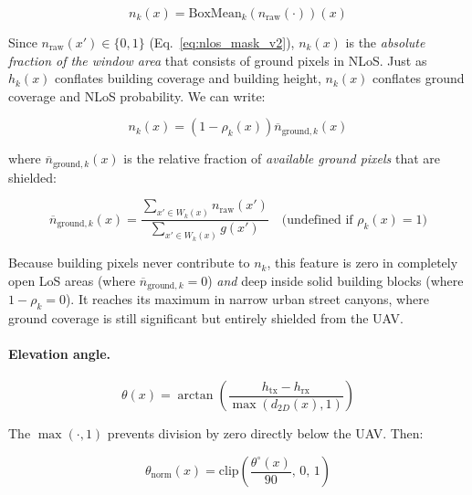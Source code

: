 \begin{equation}
n_k(x)=\mathrm{BoxMean}_k\!\left(n_{\mathrm{raw}}(\cdot)\right)(x)
\label{eq:n_k}
\end{equation}

Since $n_{\mathrm{raw}}(x') \in \{0,1\}$ (Eq.~\ref{eq:nlos_mask_v2}),
$n_k(x)$ is the \emph{absolute fraction of the window area} that consists of
ground pixels in NLoS. Just as $h_k(x)$ conflates building coverage and building
height, $n_k(x)$ conflates ground coverage and NLoS probability. We can write:

\begin{equation}
n_k(x)
=
\left(1 - \rho_k(x)\right)
\overline{n}_{\mathrm{ground}, k}(x)
\label{eq:n_k_interp}
\end{equation}

where $\overline{n}_{\mathrm{ground}, k}(x)$ is the relative fraction of
\emph{available ground pixels} that are shielded:

\begin{equation}
\overline{n}_{\mathrm{ground}, k}(x)
=
\frac{\displaystyle\sum_{x'\in W_k(x)} n_{\mathrm{raw}}(x')}
     {\displaystyle\sum_{x'\in W_k(x)} g(x')}
\quad\text{(undefined if }\rho_k(x)=1\text{)}
\end{equation}

Because building pixels never contribute to $n_k$, this feature is zero in
completely open LoS areas (where $\overline{n}_{\mathrm{ground}, k} = 0$)
\emph{and} deep inside solid building blocks (where $1 - \rho_k = 0$). It
reaches its maximum in narrow urban street canyons, where ground coverage is
still significant but entirely shielded from the UAV.

\paragraph{Elevation angle.}

\begin{equation}
\theta(x)=\arctan\left(\frac{h_{\mathrm{tx}}-h_{\mathrm{rx}}}{\max(d_{2D}(x),1)}\right)
\label{eq:theta_v2}
\end{equation}

The $\max(\cdot, 1)$ prevents division by zero directly below the UAV.
Then:

\begin{equation}
\theta_{\mathrm{norm}}(x)=
\mathrm{clip}\left(\frac{\theta^\circ(x)}{90},\,0,\,1\right)
\label{eq:theta_norm_v2}
\end{equation}

